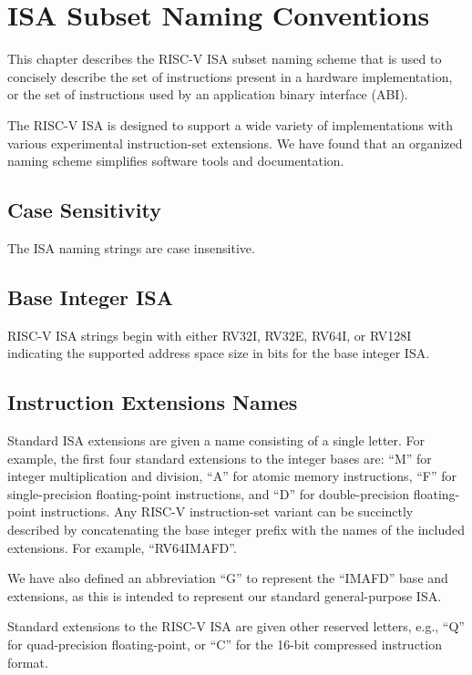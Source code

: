 \chapter{ISA Subset Naming Conventions}
\label{naming}

This chapter describes the RISC-V ISA subset naming scheme that is
used to concisely describe the set of instructions present in a
hardware implementation, or the set of instructions used by an
application binary interface (ABI).

\begin{commentary}
The RISC-V ISA is designed to support a wide variety of
implementations with various experimental instruction-set extensions.
We have found that an organized naming scheme simplifies software
tools and documentation.
\end{commentary}

\section{Case Sensitivity}

The ISA naming strings are case insensitive.

\section{Base Integer ISA}
RISC-V ISA strings begin with either RV32I, RV32E, RV64I, or RV128I
indicating the supported address space size in bits for the base
integer ISA.

\section{Instruction Extensions Names}

Standard ISA extensions are given a name consisting of a single
letter.  For example, the first four standard
extensions to the integer bases are:
``M'' for integer multiplication and division,
``A'' for atomic memory instructions,
``F'' for single-precision floating-point instructions, and
``D'' for double-precision floating-point instructions.
Any RISC-V instruction-set variant can be succinctly described by
concatenating the base integer prefix with the names of the included
extensions.  For example, ``RV64IMAFD''.

We have also defined an abbreviation ``G'' to represent the ``IMAFD''
base and extensions, as this is intended to represent our standard
general-purpose ISA.

Standard extensions to the RISC-V ISA are given other reserved
letters, e.g., ``Q'' for quad-precision floating-point, or
``C'' for the 16-bit compressed instruction format.

